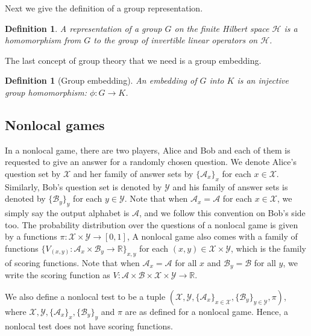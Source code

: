 \documentclass[11pt,letterpaper]{article}
\newcommand{\R}{\mathbb{R}}
\newcommand{\calH}{\mathcal{H}}
\newcommand{\calX}{\mathcal{X}}
\newcommand{\calY}{\mathcal{Y}}
\newcommand{\calA}{\mathcal{A}}
\newcommand{\calB}{\mathcal{B}}
\newcommand{\1}{\mathbb{1}}
\newtheorem{definition}[theorem]{Definition}
\theoremstyle{definition}
\begin{document}
Next we give the definition of a group representation. 
\begin{definition}
    A representation of a group $G$ on the finite Hilbert space $\calH$ is a homomorphism from $G$ to the group of invertible linear operators on $\calH$. 
\end{definition}
The last concept of group theory that we need is a group embedding.
\begin{definition}[Group embedding]
    An embedding of $G$ into $K$ is an injective group homomorphism: $\phi: G \rightarrow K$.
\end{definition}
\subsection{Nonlocal games}
In a nonlocal game, there are two players, Alice and Bob and each of them is requested
to give an answer for a randomly chosen question. 
We denote Alice's question set by $\calX$ and her family of answer sets by $\{\calA_x\}_x$
for each $x \in \calX$. Similarly,
Bob's question set is denoted by $\calY$ and 
his family of answer sets is denoted by $\{\calB_y\}_y$ for each $y \in \calY$. 
Note that when $\calA_x = \calA$ for each $x \in \calX$, we simply say the output alphabet is $\calA$, 
and we follow this convention on Bob's side too.
The probability distribution over the questions of
a nonlocal game 
is given by a functions $\pi: \calX \times \calY \rightarrow [0,1]$,
A nonlocal game also comes with a family of functions $\{ V_{(x,y)} : \calA_x \times \calB_y \rightarrow \R \}_{x,y}$ for each $(x,y) \in \calX \times \calY$, which is 
the family of scoring functions.
Note that when $\calA_x = \calA$ for all $x$ and $\calB_y = \calB$ for all $y$, we write the scoring function as 
$V: \calA \times \calB \times \calX \times \calY \rightarrow \R$.


We also define a nonlocal test 
to be a tuple $(\calX, \calY, \{\calA_x\}_{x \in \calX}, \{\calB_y\}_{y \in \calY}, \pi)$, where
$\calX, \calY, \{\calA_x\}_{x}, \{\calB_y\}_{y}$ and $\pi$ are as defined for a nonlocal game.
Hence, a nonlocal test does not have scoring functions.
\end{document}
